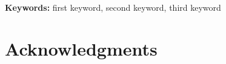 \documentclass[11pt,a4paper]{article}
\title{\PaperTitle}
\author{\PaperAuthor\\[0.5ex]
  {\normalsize Institute of Computer Science, Faculty of Science}\\
  {\normalsize Pavol Jozef Šafárik University in Košice, Košice, Slovakia}\\
  {\normalsize\texttt{5344553@upjs.sk}}}
\date{\today}
\begin{document}
\maketitle

\begin{abstract}

\end{abstract}

\noindent\textbf{Keywords:} first keyword, second keyword, third keyword






\section*{Acknowledgments}




\end{document}
